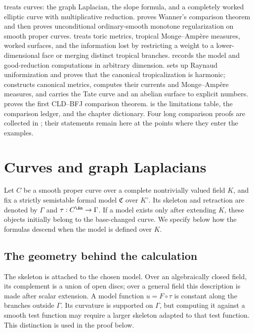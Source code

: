  treats curves: the graph Laplacian, the slope
formula, and a completely worked elliptic curve with multiplicative
reduction.   proves Wanner's comparison theorem and
then proves unconditional ordinary-smooth monotone regularization on smooth
proper curves.   treats toric
metrics, tropical Monge--Amp\`ere measures, worked surfaces, and the
information lost by restricting a weight to a lower-dimensional face
or merging distinct tropical branches.
 records the model and good-reduction computations in
arbitrary dimension.   sets up Raynaud
uniformization and proves that the canonical tropicalization is harmonic;
 constructs canonical metrics, computes their
currents and Monge--Amp\`ere measures, and carries the Tate curve and an
abelian surface to explicit numbers.   proves the
first CLD--BFJ comparison theorem.   is the
limitations table,  the comparison ledger, and
 the chapter dictionary.  Four long comparison
proofs are collected in ; their statements
remain here at the points where they enter the examples.

\section{Curves and graph Laplacians}
\label{sec:ch19-curves}

Let $C$ be a smooth proper curve over a complete nontrivially valued
field $K$, and fix a strictly semistable formal model $\mathfrak C$ over
$K^\circ$.  Its skeleton and retraction are denoted by
$\Gamma$ and $\tau:C^{\An}\to\Gamma$.
If a model exists only after extending $K$, these objects initially
belong to the base-changed curve.  We specify below how the formulas
descend when the model is defined over $K$.

\subsection{The geometry behind the calculation}
\label{sec:ch19-curve-geometry}

The skeleton is attached to the chosen model.  Over an algebraically
closed field, its complement is a union of open discs; over a general
field this description is made after scalar extension.
A model function $u=F\circ\tau$ is constant along the branches outside
$\Gamma$.  Its curvature is supported on $\Gamma$, but computing it
against a smooth test function may require a larger skeleton adapted
to that test function.  This distinction is used in the proof below.

